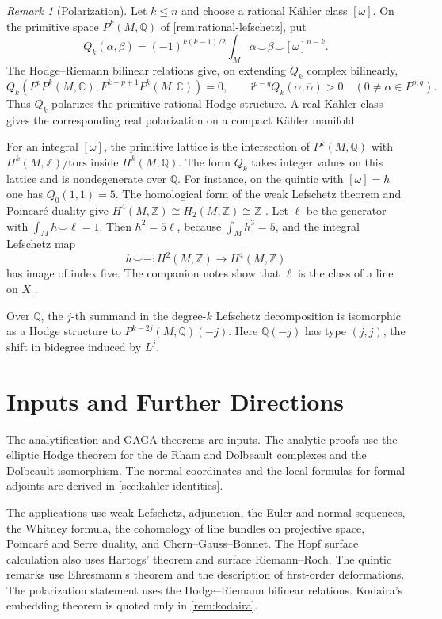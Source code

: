 \documentclass[11pt,reqno]{amsart}
\theoremstyle{definition}
\theoremstyle{remark}
\newtheorem{remark}[theorem]{Remark}
\newcommand{\C}{\mathbb{C}}
\newcommand{\Z}{\mathbb{Z}}
\newcommand{\Q}{\mathbb{Q}}
\newcommand{\ii}{\mathrm{i}}
\begin{document}
\begin{remark}[Polarization]
\label{rem:polarization}
Let $k\leq n$ and choose a rational K\"ahler class $[\omega]$. On the
primitive space $P^k(M,\Q)$ of \cref{rem:rational-lefschetz}, put
\[
Q_k(\alpha,\beta)
=(-1)^{k(k-1)/2}\int_M\alpha\smile\beta\smile[\omega]^{n-k}.
\]
The Hodge--Riemann bilinear relations
\cite[\S\S6.3.2 and 7.1.2]{voisin2002hodge} give, on extending
$Q_k$ complex bilinearly,
\[
Q_k(F^pP^k(M,\C),F^{k-p+1}P^k(M,\C))=0,
\qquad
\ii^{p-q}Q_k(\alpha,\overline\alpha)>0
\quad(0\ne\alpha\in P^{p,q}).
\]
Thus $Q_k$ polarizes the primitive rational Hodge structure. A real
K\"ahler class gives the corresponding real polarization on a compact
K\"ahler manifold.

For an integral $[\omega]$, the primitive lattice is the intersection of
$P^k(M,\Q)$ with $H^k(M,\Z)/\mathrm{tors}$ inside $H^k(M,\Q)$. The form
$Q_k$ takes integer values on this lattice and is nondegenerate over
$\Q$. For instance, on the quintic with $[\omega]=h$ one has
$Q_0(1,1)=5$. The homological form of the weak Lefschetz theorem and
Poincar\'e duality give $H^4(M,\Z)\cong H_2(M,\Z)\cong\Z$
\cite[Ch.~1]{voisin2003hodge2}. Let $\ell$ be the generator with
$\int_M h\smile\ell=1$. Then $h^2=5\ell$, because $\int_M h^3=5$, and the
integral Lefschetz map
\[
h\smile{-}:H^2(M,\Z)\longrightarrow H^4(M,\Z)
\]
has image of index five. The companion notes show that $\ell$ is the class
of a line on $X$ \cite[\S10.2]{hodgenotes}.

Over $\Q$, the $j$-th summand in the degree-$k$ Lefschetz decomposition
is isomorphic as a Hodge structure to $P^{k-2j}(M,\Q)(-j)$.
Here $\Q(-j)$ has type $(j,j)$, the shift in bidegree induced by $L^j$.
\end{remark}

\section{Inputs and Further Directions}
\label{sec:limits}

The analytification and GAGA theorems are inputs. The analytic proofs use the
elliptic Hodge theorem for the de Rham and Dolbeault complexes and the Dolbeault
isomorphism. The normal coordinates and the local formulas for formal adjoints
are derived in \cref{sec:kahler-identities}.

The applications use weak Lefschetz, adjunction, the Euler and normal
sequences, the Whitney formula, the cohomology of line bundles on projective
space, Poincar\'e and Serre duality, and Chern--Gauss--Bonnet. The Hopf surface
calculation also uses Hartogs' theorem and surface Riemann--Roch. The
quintic remarks use Ehresmann's theorem and the description of first-order
deformations. The
polarization statement uses the Hodge--Riemann bilinear relations. Kodaira's
embedding theorem is quoted only in \cref{rem:kodaira}.
\end{document}
